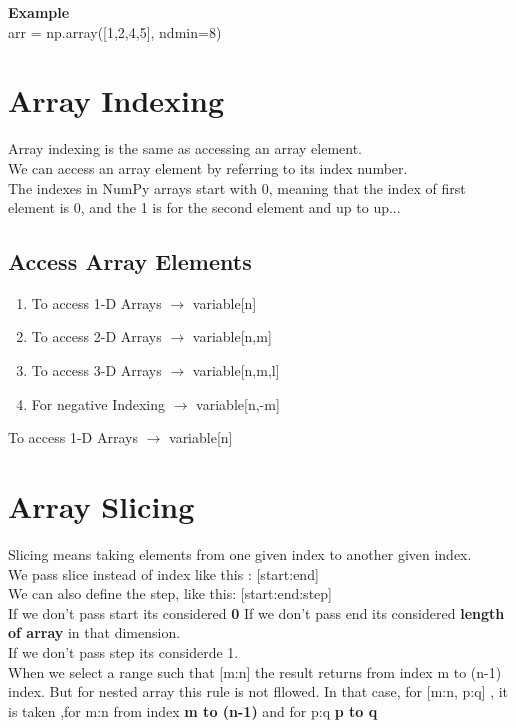 \documentclass[openany]{book}
\begin{document}
\textbf{Example}
\\
arr = np.array([1,2,4,5], ndmin=8)\\
\section{Array Indexing}

Array indexing is the same as accessing an array element. \\
We can access an array element by referring to its index number. \\
The indexes in NumPy arrays start with 0, meaning that the index of first element is 0, and the 1 is for the second element and up to up... \\
\subsection{Access Array Elements}


\begin{enumerate}
    \item To access 1-D Arrays $\rightarrow$ variable[n]
    \item To access 2-D Arrays $\rightarrow$ variable[n,m]
    \item To access 3-D Arrays $\rightarrow$ variable[n,m,l]
    \item For negative Indexing $\rightarrow$ variable[n,-m]
\end{enumerate}
To access 1-D Arrays $\rightarrow$ variable[n]


\section{Array Slicing}


Slicing means taking elements from one given index to another given index. \\
We pass slice instead of index like this : [start:end] \\
We can also define the step, like this: [start:end:step]\\
If we don't pass start its considered \textbf{0}
If we don't pass end its considered \textbf{length of array} in that dimension. \\
If we don't pass step its considerde 1.\\
When we select a range such that [m:n] the result returns from index m to (n-1) index. 
But for nested array this rule is not fllowed. In that case, for [m:n, p:q] , it is taken ,for m:n from index \textbf{m to (n-1)} and for p:q \textbf{p to q}
\end{document}
